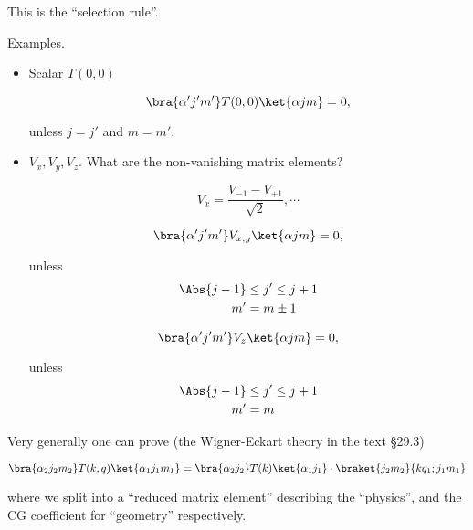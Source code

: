 This is the ``selection rule''.

Examples.

\begin{itemize}
\item Scalar $T(0, 0)$

\begin{equation}\label{eqn:qmTwoL20:190}
\bra{\alpha' j' m'} T(0, 0) \ket{\alpha j m} = 0 ,
\end{equation}

unless $j = j'$ and $m = m'$.

\item $V_x, V_y, V_z$.  What are the non-vanishing matrix elements?

\begin{equation}\label{eqn:qmTwoL20:210}
V_x = \frac{ V_{-1} - V_{+1}}{\sqrt{2}}, \cdots
\end{equation}

\begin{equation}\label{eqn:qmTwoL20:230}
\bra{\alpha' j' m'} V_{x, y} \ket{\alpha j m} = 0 ,
\end{equation}

unless
\begin{align}\label{eqn:qmTwoL20:250}
\Abs{j - 1} &\le j' \le j + 1  \\
m' &= m \pm 1
\end{align}

\begin{equation}\label{eqn:qmTwoL20:270}
\bra{\alpha' j' m'} V_{z} \ket{\alpha j m} = 0 ,
\end{equation}

unless
\begin{align}\label{eqn:qmTwoL20:290}
\Abs{j - 1} &\le j' \le j + 1  \\
m' &= m  
\end{align}
\end{itemize}

Very generally one can prove (the Wigner-Eckart theory in the text \S 29.3)

\begin{equation}\label{eqn:qmTwoL20:310}
\bra{\alpha_2 j_2 m_2} T(k, q) \ket{\alpha_1 j_1 m_1}
=
\bra{\alpha_2 j_2 } T(k) \ket{\alpha_1 j_1} \cdot
\braket{j_2 m_2}{k q_1 ; j_1 m_1} 
\end{equation}

where we split into a ``reduced matrix element'' describing the ``physics'', and the CG coefficient for ``geometry'' respectively.

\EndArticle
